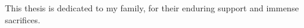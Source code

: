 \cleardoublepage

\begin{dedication}
This thesis is dedicated to my family, for their enduring support and immense sacrifices.
\end{dedication}